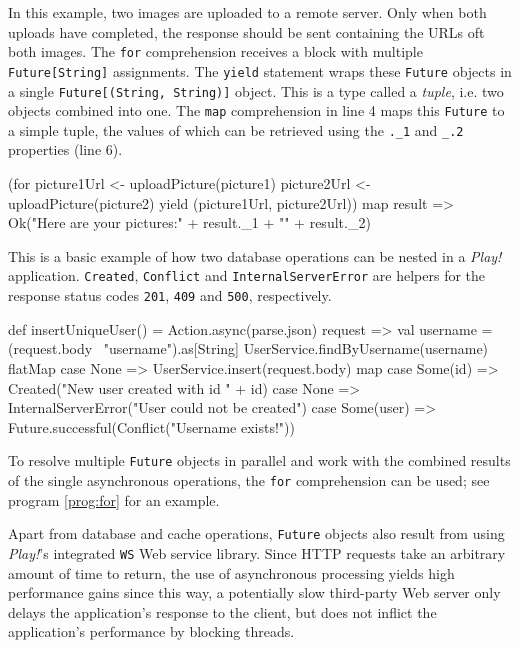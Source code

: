 \begin{program}
  \caption{In this example, two images are uploaded to a remote server. Only when both uploads have completed, the response should be sent containing the URLs oft both images. The \texttt{for} comprehension receives a block with multiple \texttt{Future[String]} assignments. The \texttt{yield} statement wraps these \texttt{Future} objects in a single \texttt{Future[(String, String)]} object. This is a type called a \textit{tuple}, i.e. two objects combined into one. The \texttt{map} comprehension in line 4 maps this \texttt{Future} to a simple tuple, the values of which can be retrieved using the \texttt{.\_1} and \texttt{\_.2} properties (line 6).}
  \label{prog:for}
\begin{JavaCode}
(for {
    picture1Url <- uploadPicture(picture1)
    picture2Url <- uploadPicture(picture2)
} yield (picture1Url, picture2Url)) map {
    result =>
        Ok("Here are your pictures:\n" + result._1 + "\n" + result._2)
}
\end{JavaCode}
\end{program}

\begin{program}
  \caption{This is a basic example of how two database operations can be nested in a \textit{Play!} application. \texttt{Created}, \texttt{Conflict} and \texttt{InternalServerError} are helpers for the response status codes \texttt{201}, \texttt{409} and \texttt{500}, respectively.}
  \label{prog:multimap}
  \begin{JavaCode}
def insertUniqueUser() = Action.async(parse.json) {
    request =>
        val username = (request.body \ "username").as[String]
        UserService.findByUsername(username) flatMap {
            case None =>
                UserService.insert(request.body) map {
                    case Some(id) =>
                        Created("New user created with id " + id)
                    case None =>
                        InternalServerError("User could not be created")
                }
             case Some(user) =>
                Future.successful(Conflict("Username exists!"))
        }
}
  \end{JavaCode}
\end{program}

To resolve multiple \texttt{Future} objects in parallel and work with the combined results of the single asynchronous operations, the \texttt{for} comprehension can be used; see program \ref{prog:for} for an example.

Apart from database and cache operations, \texttt{Future} objects also result from using \textit{Play!}'s integrated \texttt{WS} Web service library. Since HTTP requests take an arbitrary amount of time to return, the use of asynchronous processing yields high performance gains since this way, a potentially slow third-party Web server only delays the application's response to the client, but does not inflict the application's performance by blocking threads. 

